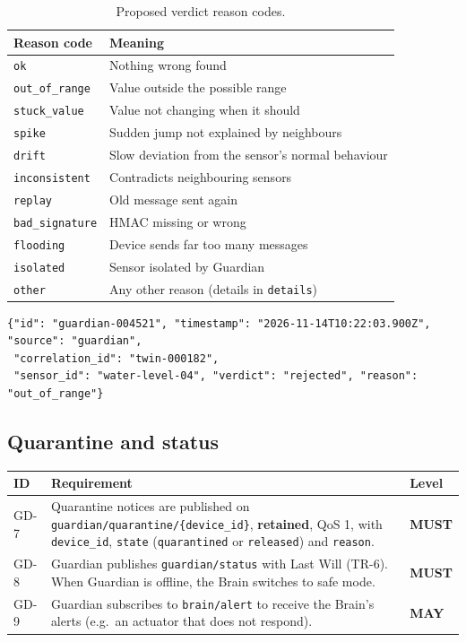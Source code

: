 \documentclass[11pt,a4paper]{article}
\newcommand{\code}[1]{\texttt{#1}}
\newcommand{\MUST}{\textbf{\textcolor{must}{MUST}}}
\newcommand{\MAY}{\textbf{\textcolor{may}{MAY}}}
\begin{document}
\begin{table}[h]
\centering
\begin{tabularx}{0.9\linewidth}{@{}l Y@{}}
\toprule
\textbf{Reason code} & \textbf{Meaning} \\
\midrule
\code{ok} & Nothing wrong found \\
\code{out\_of\_range} & Value outside the possible range \\
\code{stuck\_value} & Value not changing when it should \\
\code{spike} & Sudden jump not explained by neighbours \\
\code{drift} & Slow deviation from the sensor's normal behaviour \\
\code{inconsistent} & Contradicts neighbouring sensors \\
\code{replay} & Old message sent again \\
\code{bad\_signature} & HMAC missing or wrong \\
\code{flooding} & Device sends far too many messages \\
\code{isolated} & Sensor isolated by Guardian \\
\code{other} & Any other reason (details in \code{details}) \\
\bottomrule
\end{tabularx}
\caption{Proposed verdict reason codes.}
\label{tab:reasons}
\end{table}

\begin{lstlisting}[caption={Body of a verdict}]
{"id": "guardian-004521", "timestamp": "2026-11-14T10:22:03.900Z", "source": "guardian",
 "correlation_id": "twin-000182",
 "sensor_id": "water-level-04", "verdict": "rejected", "reason": "out_of_range"}
\end{lstlisting}

\subsection{Quarantine and status}

\begin{longtable}{@{}l p{10.9cm} l@{}}
\toprule
\textbf{ID} & \textbf{Requirement} & \textbf{Level} \\
\midrule
\endhead
GD-7 & Quarantine notices are published on \code{guardian/\allowbreak quarantine/\allowbreak \{device\_id\}}, \textbf{retained}, QoS 1, with \code{device\_id}, \code{state} (\code{quarantined} or \code{released}) and \code{reason}. & \MUST \\
GD-8 & Guardian publishes \code{guardian/status} with Last Will (TR-6). When Guardian is offline, the Brain switches to safe mode. & \MUST \\
GD-9 & Guardian subscribes to \code{brain/alert} to receive the Brain's alerts (e.g.\ an actuator that does not respond). & \MAY \\
\bottomrule
\end{longtable}
\end{document}

